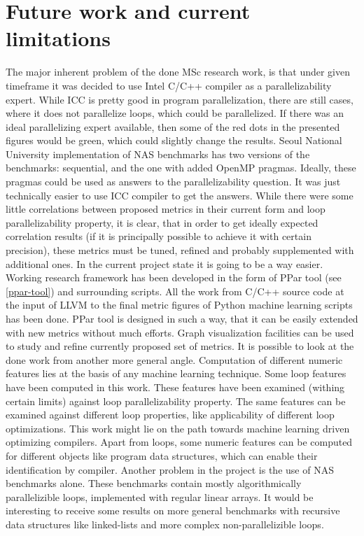 \chapter{Future work and current limitations}
\label{future-work}
\qquad The major inherent problem of the done MSc research work, is that under given timeframe it was decided to use Intel C/C++ compiler as a parallelizability expert. While ICC is pretty good in program parallelization, there are still cases, where it does not parallelize loops, which could be parallelized. If there was an ideal parallelizing expert available, then some of the red dots in the presented figures would be green, which could slightly change the results. Seoul National University implementation of NAS benchmarks has two versions of the benchmarks: sequential, and the one with added OpenMP pragmas. Ideally, these pragmas could be used as answers to the parallelizability question. It was just technically easier to use ICC compiler to get the answers.\newline  
\null\qquad While there were some little correlations between proposed metrics in their current form and loop parallelizability property, it is clear, that in order to get ideally expected correlation results (if it is principally possible to achieve it with certain precision), these metrics must be tuned, refined and probably supplemented with additional ones. In the current project state it is going to be a way easier. Working research framework has been developed in the form of PPar tool (see \ref{ppar-tool}) and surrounding scripts. All the work from C/C++ source code at the input of LLVM to the final metric figures of Python machine learning scripts has been done. PPar tool is designed in such a way, that it can be easily extended with new metrics without much efforts. Graph visualization facilities can be used to study and refine currently proposed set of metrics.\newline
\null\qquad It is possible to look at the done work from another more general angle. Computation of different numeric features lies at the basis of any machine learning technique. Some loop features have been computed in this work. These features have been examined (withing certain limits) against loop parallelizability property. The same features can be examined against different loop properties, like applicability of different loop optimizations. This work might lie on the path towards machine learning driven optimizing compilers. Apart from loops, some numeric features can be computed for different objects like program data structures, which can enable their identification by compiler.\newline
\null\qquad Another problem in the project is the use of NAS benchmarks alone. These benchmarks contain mostly algorithmically parallelizible loops, implemented with regular linear arrays. It would be interesting to receive some results on more general benchmarks with recursive data structures like linked-lists and more complex non-parallelizible loops.  
